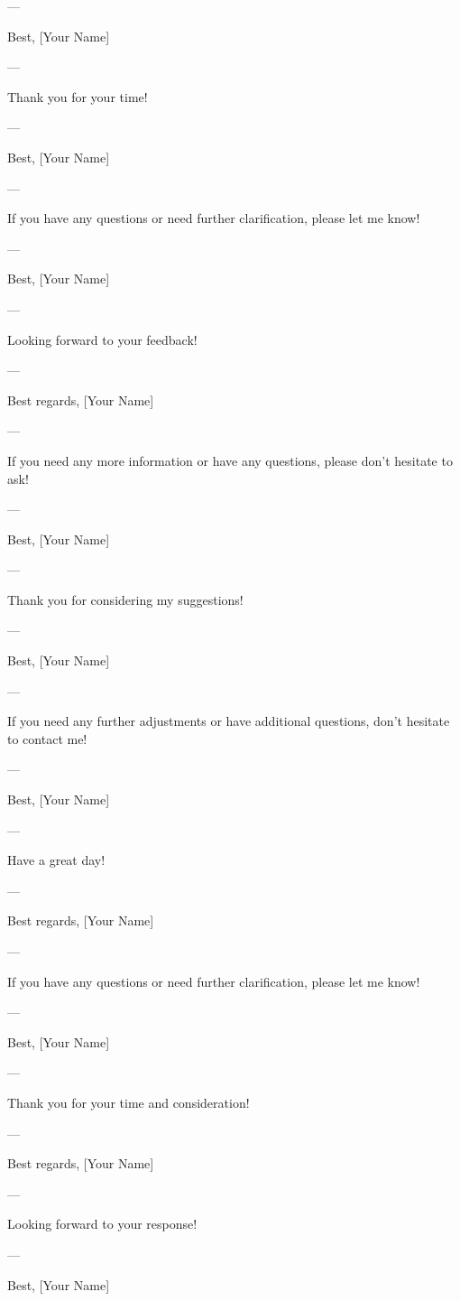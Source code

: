 --- 

Best,  
[Your Name]  

--- 

Thank you for your time! 

--- 

Best,  
[Your Name]  

--- 

If you have any questions or need further clarification, please let me know! 

--- 

Best,  
[Your Name]  

--- 

Looking forward to your feedback! 

--- 

Best regards,  
[Your Name]  

--- 

If you need any more information or have any questions, please don't hesitate to ask! 

--- 

Best,  
[Your Name]  

--- 

Thank you for considering my suggestions! 

--- 

Best,  
[Your Name]  

--- 

If you need any further adjustments or have additional questions, don't hesitate to contact me! 

--- 

Best,  
[Your Name]  

--- 

Have a great day! 

--- 

Best regards,  
[Your Name]  

--- 

If you have any questions or need further clarification, please let me know! 

--- 

Best,  
[Your Name]  

--- 

Thank you for your time and consideration! 

--- 

Best regards,  
[Your Name]  

--- 

Looking forward to your response! 

--- 

Best,  
[Your Name]  

